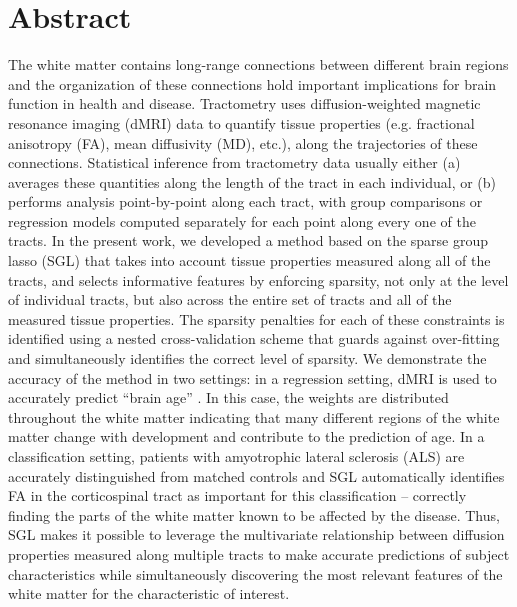 \section*{Abstract}

The white matter contains long-range connections between different
brain regions and the organization of these connections hold important
implications for brain function in health and disease. Tractometry
uses diffusion-weighted magnetic resonance imaging (dMRI) data
to quantify tissue properties (e.g. fractional anisotropy (FA),
mean diffusivity (MD), etc.), along the trajectories of these
connections\cite{yeatman2012tract}. Statistical inference from
tractometry data usually either (a) averages these quantities along
the length of the tract in each individual, or (b) performs analysis
point-by-point along each tract, with group comparisons or regression
models computed separately for each point along every one of the tracts.
In the present work, we developed a method based on the sparse group
lasso (SGL) \cite{simon2013sparse} that takes into account tissue
properties measured along all of the tracts, and selects informative
features by enforcing sparsity, not only at the level of individual
tracts, but also across the entire set of tracts and all of the measured
tissue properties. The sparsity penalties for each of these constraints
is identified using a nested cross-validation scheme that guards
against over-fitting and simultaneously identifies the correct level of
sparsity. We demonstrate the accuracy of the method in two settings:
in a regression setting, dMRI is used to accurately predict ``brain
age'' \cite{yeatman2014lifespan, Brown2012-so}. In this case, the
weights are distributed throughout the white matter indicating that
many different regions of the white matter change with development
and contribute to the prediction of age. In a classification setting,
patients with amyotrophic lateral sclerosis (ALS) are accurately
distinguished from matched controls\cite{sarica2017corticospinal} and
SGL automatically identifies FA in the corticospinal tract as important
for this classification -- correctly finding the parts of the white
matter known to be affected by the disease. Thus, SGL makes it possible
to leverage the multivariate relationship between diffusion properties
measured along multiple tracts to make accurate predictions of subject
characteristics while simultaneously discovering the most relevant
features of the white matter for the characteristic of interest.
